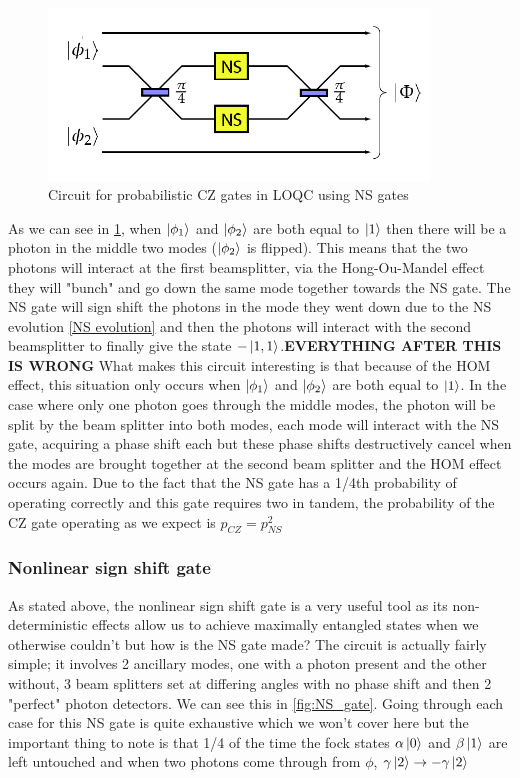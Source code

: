 \begin{figure}[h]
    \centering
    \includegraphics[width=0.9\textwidth]{images/CZ-gate.png}
    \caption{Circuit for probabilistic CZ gates in LOQC using NS gates}\label{fig:CZ_gate}
\end{figure}

As we can see in \ref{fig:CZ_gate}, when $\ket{\phi_1}$ and $\ket{\phi_2}$ are both equal to $\ket{1}$ then there will be a photon in the middle two modes ($\ket{\phi_2}$ is flipped). This means that the two photons will interact at the first beamsplitter, via the Hong-Ou-Mandel effect they will "bunch" and go down the same mode together towards the NS gate. The NS gate will sign shift the photons in the mode they went down due to the NS evolution \ref{NS evolution} and then the photons will interact with the second beamsplitter to finally give the state $-\ket{1,1}$.\textbf{EVERYTHING AFTER THIS IS WRONG} What makes this circuit interesting is that because of the HOM effect, this situation only occurs when $\ket{\phi_1}$ and $\ket{\phi_2}$ are both equal to $\ket{1}$. In the case where only one photon goes through the middle modes, the photon will be split by the beam splitter into both modes, each mode will interact with the NS gate, acquiring a phase shift each but these phase shifts destructively cancel when the modes are brought together at the second beam splitter and the HOM effect occurs again. Due to the fact that the NS gate has a 1/4th probability of operating correctly and this gate requires two in tandem, the probability of the CZ gate operating as we expect is $p_{CZ} = p_{NS}^2 $

\subsubsection{Nonlinear sign shift gate}
As stated above, the nonlinear sign shift gate is a very useful tool as its non-deterministic effects allow us to achieve maximally entangled states when we otherwise couldn't but how is the NS gate made? The circuit is actually fairly simple; it involves 2 ancillary modes, one with a photon present and the other without, 3 beam splitters set at differing angles with no phase shift and then 2 "perfect" photon detectors. We can see this in \ref{fig:NS_gate}. Going through each case for this NS gate is quite exhaustive which we won't cover here but the important thing to note is that 1/4 of the time the fock states $\alpha\ket{0}$ and $\beta\ket{1}$ are left untouched and when two photons come through from $\phi$, $\gamma\ket{2} \rightarrow -\gamma\ket{2}$ 

